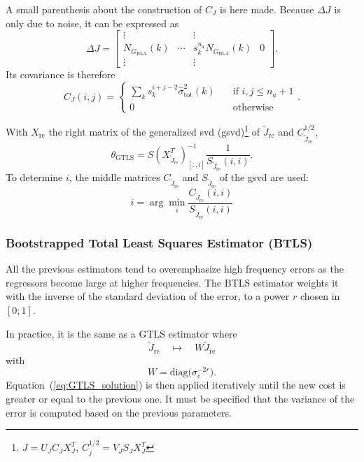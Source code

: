 A small parenthesis about the construction of $C_J$ is here made. Because $\Delta J$ is only due to noise, it can be expressed as
\begin{equation}
    \Delta J = \begin{bmatrix}
        \vdots & & \vdots & \\
        N_{G_{\text{BLA}}}(k) & \cdots & s_k^{n_a}N_{G_{\text{BLA}}}(k) & 0\\
        \vdots & & \vdots &
    \end{bmatrix}.
\end{equation}
Its covariance is therefore 
\begin{equation}
    C_J(i, j) = \begin{cases}
        \sum_k s_k^{i+j-2} \hat{\sigma}_\text{tot}^2(k) \quad & \text{if } i, j \leq n_a+1\\
        0 & \text{otherwise}
    \end{cases}.
\end{equation}


With $X_{\text{re}}$ the right matrix of the generalized svd (gsvd)\footnote{$J = U_J C_J X_J^T$, $C_j^{1/2} = V_J S_J X_J^T$} of $\tilde{J}_{\text{re}}$ and $C_{\tilde{J}_{\text{re}}}^{1/2}$,
\begin{equation}
    \theta_{\text{GTLS}} = S (X_{\tilde{J}_{\text{re}}}^T)_{[:,i]}^{-1} \frac{1}{S_{\tilde{J}_{\text{re}}}(i, i)}.
    \label{eq:GTLS_solution}
\end{equation} 
To determine $i$, the middle matrices $C_{\tilde{J}_{\text{re}}}$ and $S_{\tilde{J}_{\text{re}}}$ of the gsvd are used:
\begin{equation}
    i = \arg \min_i \frac{C_{\tilde{J}_{\text{re}}}(i, i)}{S_{\tilde{J}_{\text{re}}}(i, i)}
\end{equation}

\subsubsection{Bootstrapped Total Least Squares Estimator (BTLS)}

All the previous estimators tend to overemphasize high frequency errors as the regressors become large at higher frequencies. The BTLS estimator weights it with the inverse of the standard deviation of the error, to a power $r$ chosen in $[0; 1]$.

In practice, it is the same as a GTLS estimator where
\begin{equation}
    \tilde{J}_{\text{re}} \quad \mapsto \quad W \tilde{J}_{\text{re}}
\end{equation}
with
\begin{equation}
    W = \text{diag}\Big(\sigma_e^{-2r}\Big).
\end{equation}
Equation~(\ref{eq:GTLS_solution}) is then applied iteratively until the new cost is greater or equal to the previous one. It must be specified that the variance of the error is computed based on the previous parameters. 

